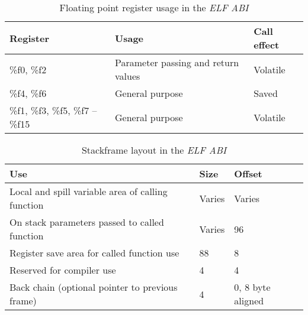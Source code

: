 \begin{table}
\centering
\begin{tabular}{|l|l|l|}
\hline
Register                       & Usage                                  & Call effect \\
\hline
\%f0, \%f2                     & Parameter passing and return values    & Volatile \\
\%f4, \%f6                     & General purpose                        & Saved \\
\%f1, \%f3, \%f5, \%f7 – \%f15 & General purpose                        & Volatile \\
\hline
\end{tabular}
\caption{Floating point register usage in the \emph{ELF ABI}}
\label{s390:tbl:elf:fpreg}
\end{table}

\begin{table}
\centering
\begin{tabular}{|l|l|l|}
\hline
Use & Size & Offset \\
\hline
Local and spill variable area of calling function & Varies & Varies \\
On stack parameters passed to called function & Varies & 96 \\
Register save area for called function use & 88 & 8 \\
Reserved for compiler use & 4 & 4 \\
Back chain (optional pointer to previous frame) & 4 & 0, 8 byte aligned \\
\hline
\end{tabular}
\caption{Stackframe layout in the \emph{ELF ABI}}
\label{s390:tbl:elf:stack}
\end{table}

